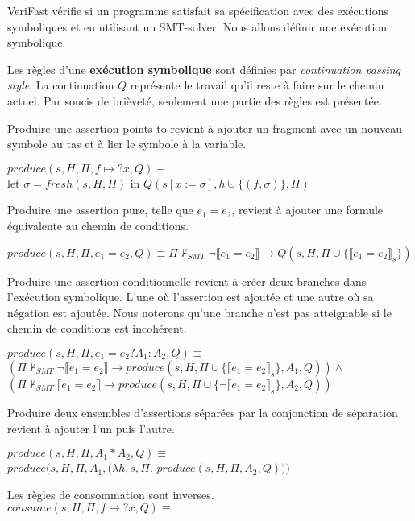 \documentclass[11pt,openany]{article}
\newcommand{\verifast}{VeriFast}
\begin{document}
	\verifast{} v\'erifie si un programme satisfait sa sp\'ecification avec des ex\'ecutions symboliques et en utilisant un SMT-solver. Nous allons d\'efinir une ex\'ecution symbolique.
	
	Les r\`egles d'une \textbf{ex\'ecution symbolique} sont d\'efinies par \textit{continuation passing style}. La continuation $Q$ repr\'esente le travail qu'il reste \`a faire sur le chemin actuel. Par soucis de bri\`evet\'e, seulement une partie des r\`egles est pr\'esent\'ee.
	
	Produire une assertion points-to revient \`a ajouter un fragment avec un nouveau symbole au tas et \`a lier le symbole \`a la variable.
	\begin{center}
		$produce(s,H,\Pi,f\mapsto?x,Q)\equiv$\\
		let $\sigma=fresh(s,H,\Pi)$ in $Q(s[x:=\sigma],h\cupdot\{(f,\sigma)\},\Pi)$
	\end{center}
	Produire une assertion pure, telle que $e_1 = e_2$, revient \`a ajouter une formule \'equivalente au chemin de conditions.
	\begin{center}
		$produce(s,H,\Pi,e_1 = e_2,Q)\equiv\Pi\not\vdash_{SMT}\neg\llbracket e_1 = e_2\rrbracket\rightarrow Q(s,H,\Pi\cup\{\llbracket e_1 = e_2\rrbracket_s\})$
	\end{center}
	Produire une assertion conditionnelle revient \`a cr\'eer deux branches dans l'ex\'ecution symbolique. L'une o\`u l'assertion est ajout\'ee et une autre o\`u sa n\'egation est ajout\'ee. Nous noterons qu'une branche n'est pas atteignable si le chemin de conditions est incoh\'erent.
	\begin{center}
		$produce(s,H,\Pi,e_1 = e_2?A_1:A_2,Q)\equiv$\\
		$(\Pi\not\vdash_{SMT}\neg\llbracket e_1 = e_2\rrbracket\rightarrow produce(s,H,\Pi\cup\{\llbracket e_1 = e_2\rrbracket_s\},A_1,Q))\land$\\
		$(\Pi\not\vdash_{SMT}\llbracket e_1 = e_2\rrbracket\rightarrow produce(s,H,\Pi\cup\{\neg\llbracket e_1 = e_2\rrbracket_s\},A_2,Q))$
	\end{center}
	Produire deux ensembles d'assertions s\'epar\'ees par la conjonction de s\'eparation revient \`a ajouter l'un puis l'autre.
	\begin{center}
		$produce(s,H,\Pi,A_1*A_2,Q)\equiv$\\
		$produce(s,H,\Pi,A_1,(\lambda h,s,\Pi.$ $produce(s,H,\Pi,A_2,Q)))$
	\end{center}
	
	Les r\`egles de consommation sont inverses.\\
	$consume(s,H,\Pi,f\mapsto?x,Q)\equiv$
	
\end{document}
